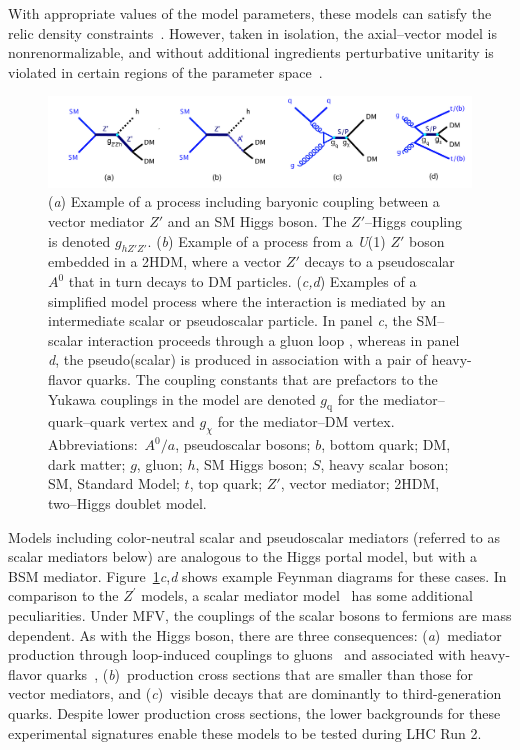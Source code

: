 \documentclass{ar-1col}
\newcommand{\chiDM}{\ensuremath{\chi}\xspace}
\newcommand{\gDM}{\ensuremath{g_{\chiDM}}\xspace}
\newcommand{\gdm}{\gDM}
\newcommand{\gq}{$g_{\mathrm{q}}$\xspace}
\newcommand{\ghZprimeZprime}{\ensuremath{g_{hZ'Z'}}\xspace}
\newcommand{\Zprime}{\ensuremath{{Z}^\prime}\xspace}
\begin{document}
{With appropriate values of the model parameters, 
these models can satisfy the relic density
constraints~\cite{Chala:2015ama}. However, taken in isolation,
the axial--vector model is nonrenormalizable, and without additional ingredients 
perturbative unitarity is violated in certain regions of the
parameter space~\cite{Chala:2015ama,Kahlhoefer:2015bea,Boveia:2016mrp}.

\begin{figure}[!htpb]
\includegraphics[width=\textwidth]{figures/feynman_1}
\caption{
(\textit{a}) Example of a process including baryonic coupling between a vector mediator $Z'$ and an SM Higgs boson. The $Z'$--Higgs coupling is denoted \ghZprimeZprime. 
(\textit{b}) Example of a process from a \textit{U}(1) $Z'$ boson embedded in a 2HDM, where a vector $Z'$ decays to a pseudoscalar $A^0$ that in turn decays to DM particles. 
(\textit{c,d}) Examples of a simplified model process where the interaction is mediated by an intermediate scalar or pseudoscalar particle. In panel \textit{c}, the SM--scalar interaction proceeds through a gluon loop \cite{Haisch:2013ata}, whereas in panel \textit{d}, the pseudo(scalar) is produced in association with a pair of heavy-flavor quarks. The coupling constants that are prefactors to the Yukawa couplings in the model are denoted \gq for the mediator--quark--quark vertex and \gdm for the mediator--DM vertex. 
Abbreviations:\ $A^0/a$, pseudoscalar bosons; $b$, bottom quark; DM, dark matter;  $g$, gluon; $h$, SM Higgs boson; $S$, heavy scalar boson; SM, Standard Model; $t$, top quark; $Z'$, vector mediator; 2HDM, two--Higgs doublet model. }
\label{fig:feynman_1}
\end{figure}

Models including {color-neutral scalar and pseudoscalar mediators (referred to as scalar mediators below)} are analogous
to the Higgs portal model, but with a BSM mediator. Figure~\ref{fig:feynman_1}\textit{c},\textit{d} shows example Feynman diagrams for these cases.  In comparison to the \Zprime
models, a scalar mediator
model~\cite{Buckley:2014fba} has some additional peculiarities.
Under MFV, the couplings of the scalar bosons to fermions
are mass dependent. As with the Higgs boson, there are three
consequences: (\textit{a})\ mediator production through loop-induced
couplings to gluons~\cite{Haisch:2015ioa} and associated with
heavy-flavor quarks~\cite{Buckley:2014fba}, (\textit{b})\ production
cross sections that are smaller than those for vector mediators, and (\textit{c})\ visible
decays that are dominantly to third-generation quarks.
Despite lower production cross sections, the lower backgrounds for these
experimental signatures enable these models to be tested during
LHC Run 2.

}
\end{document}
